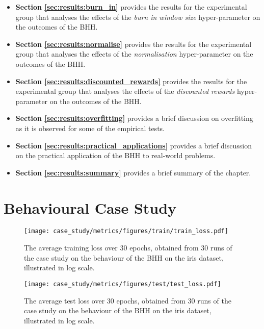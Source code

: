 \begin{itemize}
	\item \textbf{Section \ref{sec:results:burn_in}} provides the results for the experimental group that analyses the effects of the \textit{burn in window size} hyper-parameter on the outcomes of the \acs{BHH}.

	\item \textbf{Section \ref{sec:results:normalise}} provides the results for the experimental group that analyses the effects of the \textit{normalisation} hyper-parameter on the outcomes of the \acs{BHH}.

	\item \textbf{Section \ref{sec:results:discounted_rewards}} provides the results for the experimental group that analyses the effects of the \textit{discounted rewards} hyper-parameter on the outcomes of the \acs{BHH}.

	\item \textbf{Section \ref{sec:results:overfitting}} provides a brief discussion on overfitting as it is observed for some of the empirical tests.

	\item \textbf{Section \ref{sec:results:practical_applications}} provides a brief discussion on the practical application of the \acs{BHH} to real-world problems.

	\item \textbf{Section \ref{sec:results:summary}} provides a brief summary of the chapter.
\end{itemize}

\section{Behavioural Case Study}\label{sec:results:case_study}



\begin{figure}[htpb]
	\centering
	\texttt{[image: case\_study/metrics/figures/train/train\_loss.pdf]}
	\caption{The average training loss over 30 epochs, obtained from 30 runs of the case study on the behaviour of the \acs{BHH} on the iris dataset, illustrated in log scale.}
	\label{fig:results:case_study:train_loss}
\end{figure}

\begin{figure}[htpb]
	\centering
	\texttt{[image: case\_study/metrics/figures/test/test\_loss.pdf]}
	\caption{The average test loss over 30 epochs, obtained from 30 runs of the case study on the behaviour of the \acs{BHH} on the iris dataset, illustrated in log scale.}
	\label{fig:results:case_study:test_loss}
\end{figure}

